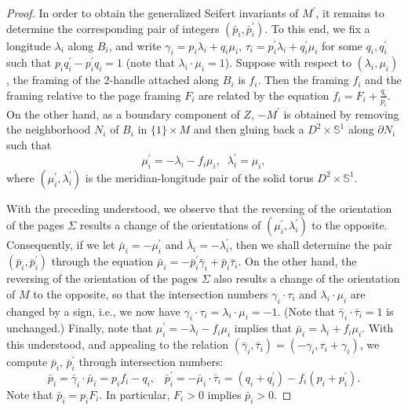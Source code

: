 \documentclass[10pt,a4paper]{amsart}
\newcommand{\s}{{\mathbb S}}
\begin{document}
\begin{proof}
In order to obtain the generalized Seifert invariants of $M^\prime$, it remains to determine the
corresponding pair of integers $(\bar{p}_i,\bar{p}_i^\prime)$. To this end, 
we fix a longitude $\lambda_i$ along $B_i$, and write $\gamma_i=p_i\lambda_i+q_i\mu_i$, 
$\tau_i=p_i^\prime\lambda_i+q^\prime_i\mu_i$ for some $q_i,q_i^\prime$ such that 
$p_iq_i^\prime-p_i^\prime q_i=1$ (note that $\lambda_i\cdot\mu_i=1$). 
Suppose with respect to $(\lambda_i,\mu_i)$, the framing of the $2$-handle attached along $B_i$
is $f_i$. Then the framing $f_i$ and the framing relative to the page framing $F_i$ are related by
the equation $f_i=F_i+\frac{q_i}{p_i}$. On the other hand, as a boundary component of $Z$, 
$-M^\prime$ is obtained by removing the neighborhood $N_i$ of $B_i$ in $\{1\}\times M$ and then
gluing back a $D^2\times \s^1$ along $\partial N_i$ such that 
$$
\mu_i^\prime=-\lambda_i-f_i\mu_i,\;\; \lambda_i^\prime=\mu_i,
$$
where $(\mu_i^\prime,\lambda_i^\prime)$ is the meridian-longitude pair of the solid torus 
$D^2\times \s^1$. 

With the preceding understood, we observe that the reversing of the orientation of the pages $\Sigma$ 
results a change of the orientations of $(\mu_i^\prime,\lambda_i^\prime)$ to the opposite. Consequently, if we let $\bar{\mu}_i=-\mu_i^\prime$ and $\bar{\lambda}_i=-\lambda_i^\prime$, 
then we shall determine the pair $(\bar{p}_i,\bar{p}_i^\prime)$ through the equation
$\bar{\mu}_i=-\bar{p}_i ^\prime\bar{\gamma}_i+\bar{p}_i \bar{\tau}_i$. On the other hand, 
the reversing of the orientation of the pages $\Sigma$ also results a change of the orientation of
$M$ to the opposite, so that the intersection numbers $\gamma_i\cdot\tau_i$ and 
$\lambda_i\cdot \mu_i$ are changed by a sign, i.e., we now have 
$\gamma_i\cdot\tau_i=\lambda_i\cdot \mu_i=-1$. (Note that $\bar{\gamma}_i\cdot \bar{\tau}_i=1$
is unchanged.) Finally, note that $\mu_i^\prime=-\lambda_i-f_i\mu_i$ implies that 
$\bar{\mu}_i=\lambda_i+f_i\mu_i$. With this understood, and appealing to the relation
$(\bar{\gamma}_i,\bar{\tau}_i)=(-\gamma_i, \tau_i+\gamma_i)$, we compute $\bar{p}_i$, 
$\bar{p}_i^\prime$ through intersection numbers:
$$
\bar{p}_i=\bar{\gamma}_i\cdot \bar{\mu}_i=p_if_i-q_i, \;\;\; 
\bar{p}_i^\prime=-\bar{\mu}_i\cdot \bar{\tau}_i=(q_i+q_i^\prime)-f_i(p_i+p_i^\prime).
$$
Note that $\bar{p}_i=p_i F_i$. In particular, $F_i>0$ implies $\bar{p}_i>0$.


\end{proof}
\end{document}
